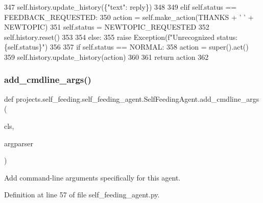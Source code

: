 \begin{DoxyCode}
347                     self.history.update\_history(\{\textcolor{stringliteral}{"text"}: reply\})
348 
349             \textcolor{keywordflow}{elif} self.status == FEEDBACK\_REQUESTED:
350                 action = self.make\_action(THANKS + \textcolor{stringliteral}{' '} + NEWTOPIC)
351                 self.status = NEWTOPIC\_REQUESTED
352                 self.history.reset()
353 
354             \textcolor{keywordflow}{else}:
355                 \textcolor{keywordflow}{raise} Exception(f\textcolor{stringliteral}{"Unrecognized status: \{self.status\}"})
356 
357         \textcolor{keywordflow}{if} self.status == NORMAL:
358             action = super().act()
359             self.history.update\_history(action)
360 
361         \textcolor{keywordflow}{return} action
362 
\end{DoxyCode}
\mbox{\label{classprojects_1_1self__feeding_1_1self__feeding__agent_1_1SelfFeedingAgent_a22f9ef0ce5fb83da14d404296476ad0f}} 
\subsubsection{\texorpdfstring{add\+\_\+cmdline\+\_\+args()}{add\_cmdline\_args()}}
{\footnotesize\ttfamily def projects.\+self\+\_\+feeding.\+self\+\_\+feeding\+\_\+agent.\+Self\+Feeding\+Agent.\+add\+\_\+cmdline\+\_\+args (\begin{DoxyParamCaption}\item[{}]{cls,  }\item[{}]{argparser }\end{DoxyParamCaption})}

\begin{DoxyVerb}Add command-line arguments specifically for this agent.
\end{DoxyVerb}
 

Definition at line 57 of file self\+\_\+feeding\+\_\+agent.\+py.



